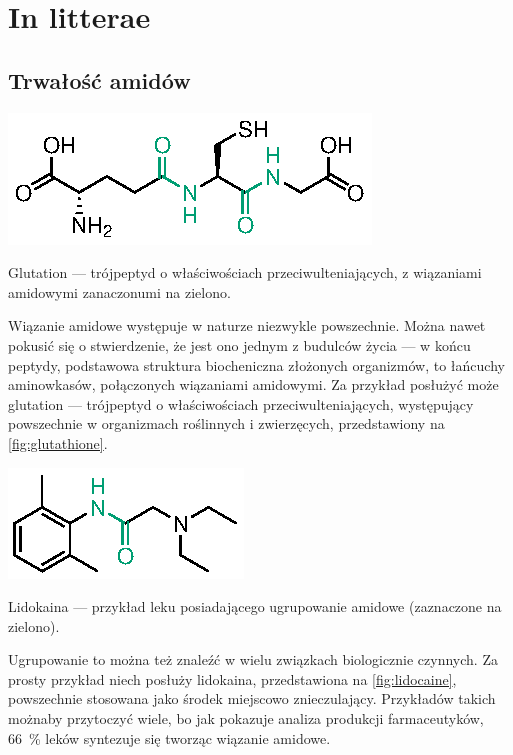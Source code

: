 \chapter{In litterae}

\section{Trwałość amidów}

\begin{marginfigure}[7\baselineskip]
  \includegraphics{schemes/glutathione}
  \caption{
    Glutation --- trójpeptyd o właściwościach przeciwulteniających,
    z wiązaniami amidowymi zanaczonumi na zielono.
  }
  \label{fig:glutathione}
\end{marginfigure}
Wiązanie amidowe występuje w naturze niezwykle powszechnie.
Można nawet pokusić się o stwierdzenie, że jest ono jednym z budulców życia ---
w końcu peptydy, podstawowa struktura biocheniczna złożonych organizmów,
to łańcuchy aminowkasów, połączonych wiązaniami amidowymi.
Za przykład posłużyć może glutation --- trójpeptyd o właściwościach przeciwulteniających,
występujący powszechnie w organizmach roślinnych i zwierzęcych\autocite{wu04},
przedstawiony na \cref{fig:glutathione}.
  
\begin{marginfigure}
  \includegraphics{schemes/lidocaine}
  \caption{
    Lidokaina --- przykład leku posiadającego ugrupowanie amidowe
    (zaznaczone na zielono).
  }
  \label{fig:lidocaine}
\end{marginfigure}
Ugrupowanie to można też znaleźć w wielu związkach biologicznie czynnych.
Za prosty przykład niech posłuży lidokaina, przedstawiona na \cref{fig:lidocaine},
powszechnie stosowana jako środek miejscowo znieczulający.
Przykładów takich możnaby przytoczyć wiele, bo jak pokazuje analiza produkcji farmaceutyków,
\SI{66}{\percent} leków syntezuje się tworząc wiązanie amidowe\autocite{carey06}.

